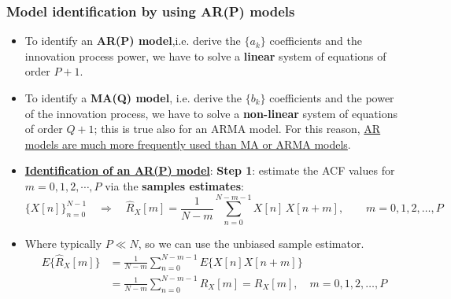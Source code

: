 \subsubsection{Model identification by using AR(P) models}
\begin{itemize}
\item To identify an \textbf{AR(P) model},i.e. derive the \(\{a_k\}\) coefficients and the innovation process power, we have to solve a \textbf{linear} system of equations of order \(P+1\).
\item To identify a \textbf{MA(Q) model}, i.e. derive the \(\{b_k\}\) coefficients and the power of the innovation process, we have to solve a \textbf{non-linear} system of equations of order \(Q+1\); this is true also for an ARMA model. For this reason, \underline{AR models are much more frequently used than MA or ARMA models}.
\item \underline{\textbf{Identification of an AR(P) model}}:
\noindent \textbf{Step 1}: estimate the ACF values for \(m=0,1,2,\cdots,P\) via the \textbf{samples estimates}:
\[
\{X[n]\}_{n=0}^{N-1}\quad\Rightarrow\quad\hat{R}_X[m] = \frac{1}{N-m}\sum_{n=0}^{N-m-1} X[n]\,X[n+m], \qquad m = 0,1,2,\dots,P
\]
\item Where typically \(P\ll N\), so we can use the unbiased sample estimator.
\begin{align*}
E\{\hat{R}_X[m]\}
&= \frac{1}{N-m}\sum_{n=0}^{N-m-1} E\{X[n]X[n+m]\}\\[4pt]
&= \frac{1}{N-m}\sum_{n=0}^{N-m-1} R_X[m]
= R_X[m], \quad m = 0,1,2,\dots,P
\end{align*}


\end{itemize}
